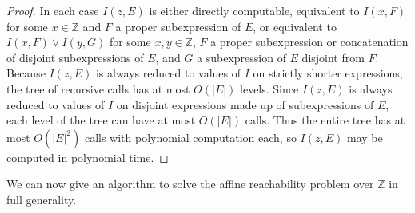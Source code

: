 \documentclass[11pt]{amsart}
\newcommand{\Z}{\mathbb{Z}}
\theoremstyle{definition}
\theoremstyle{remark}
\begin{document}
\begin{proof}
In each case $I(z,E)$ is either directly computable, equivalent to $I(x, F)$ for some $x \in \Z$ and $F$ a proper subexpression of $E$, or equivalent to $I(x,F) \lor I(y, G)$ for some $x,y \in \Z$, $F$ a proper subexpression or concatenation of disjoint subexpressions of $E$, and $G$ a subexpression of $E$ disjoint from $F$. Because $I(z,E)$ is always reduced to values of $I$ on strictly shorter expressions, the tree of recursive calls has at most $O(|E|)$ levels. Since $I(z,E)$ is always reduced to values of $I$ on disjoint expressions made up of subexpressions of $E$, each level of the tree can have at most $O(|E|)$ calls. Thus the entire tree has at most $O(|E|^2)$ calls with polynomial computation each, so $I(z,E)$ may be computed in polynomial time.
\end{proof}

We can now give an algorithm to solve the affine reachability problem over $\Z$ in full generality.
\end{document}
